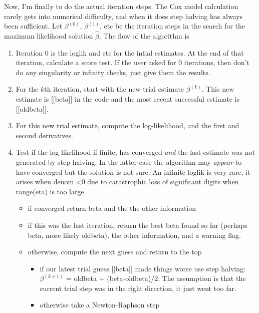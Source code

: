 \documentclass{article}
\begin{document}
Now, I'm finally to do the actual iteration steps.
The Cox model calculation rarely gets into numerical difficulty, and when it
does step halving has always been sufficient.
Let $\beta^{(0)}$, $\beta^{(1)}$, etc be the iteration steps in the search 
for the maximum likelihood solution $\hat \beta$.
The flow of the algorithm is 
\begin{enumerate} 
  \item Iteration 0 is the loglik and etc for the intial estimates.
     At the end of that iteration, calculate a score test.  If the user
     asked for 0 iterations, then don't do any singularity or infinity checks,
     just give them the results.
  \item For the $k$th iteration, start with the new trial estimate
    $\beta^{(k)}$.  This new estimate is [[beta]] in the code and the
    most recent successful estimate is [[oldbeta]].
  \item For this new trial estimate, compute the log-likelihood, and the
    first and second derivatives.
  \item Test if the log-likelihood if finite, has converged \emph{and} 
    the last estimate
    was not generated by step-halving.  In the latter case the algorithm may
    \emph{appear} to have converged but the solution is not sure.
    An infinite loglik is very rare, it arises when denom <0 due to catastrophic
    loss of significant digits when range(eta) is too large.
    \begin{itemize}
      \item if converged return beta and the the other information
      \item if this was the last iteration, return the best beta found so
        far (perhaps beta, more likely oldbeta), the other information,
        and a warning flag.
     \item otherwise, compute the next guess and return to the top
        \begin{itemize}
          \item if our latest trial guess [[beta]] made things worse use step
            halving: $\beta^{(k+1)}$ = oldbeta + (beta-oldbeta)/2.  
            The assumption is that the current trial step was in the right
            direction, it just went too far. 
          \item otherwise take a Newton-Raphson step
        \end{itemize}
    \end{itemize}
\end{enumerate}
\end{document}
